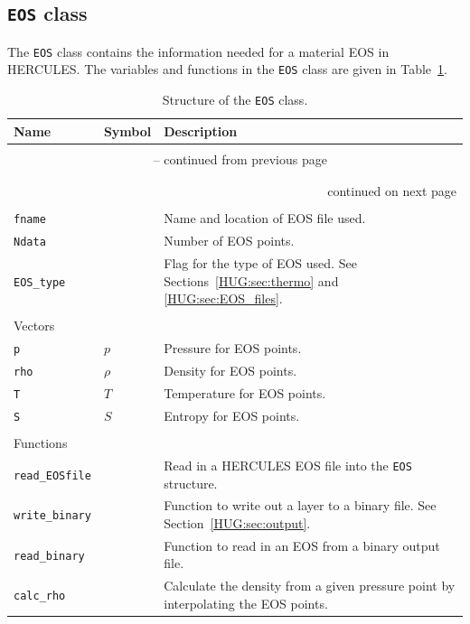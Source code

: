 \documentclass[11pt, oneside]{article}   	%
\begin{document}
\subsection{\texttt{EOS} class}
\label{HUG:sec:EOS_class}

The \texttt{EOS} class contains the information needed for a material EOS in HERCULES.
The variables and functions in the \texttt{EOS} class are given in Table~\ref{HUG:tab:EOS_class}.

\begin{longtable}{l l p{10cm}}
\caption{Structure of the \texttt{EOS} class.}
\label{HUG:tab:EOS_class} \\

Name & Symbol & Description \\ \hline \hline
\multicolumn{3}{l}{} \\
\endfirsthead

\multicolumn{3}{c}{{\tablename\ \thetable{} -- continued from previous page}} \\
\multicolumn{3}{l}{} \\
\endhead

\multicolumn{3}{l}{} \\
\multicolumn{3}{r}{{continued on next page}} \\
\endfoot

\endlastfoot

\multicolumn{3}{l}{Variables} \\
\hline
\texttt{fname} & & Name and location of EOS file used. \\
\texttt{Ndata} & & Number of EOS points. \\
\texttt{EOS\_type} & & Flag for the type of EOS used. See Sections~\ref{HUG:sec:thermo} and \ref{HUG:sec:EOS_files}. \\


\multicolumn{3}{l}{} \\
\multicolumn{3}{l}{Vectors} \\
\hline
\texttt{p} & $p$ & Pressure for EOS points. \\
\texttt{rho} & $\rho$ & Density for EOS points. \\
\texttt{T} & $T$ & Temperature for EOS points. \\
\texttt{S} & $S$ & Entropy for EOS points. \\

\multicolumn{3}{l}{} \\
\multicolumn{3}{l}{Functions} \\
\hline
\texttt{read\_EOSfile} & & Read in a HERCULES EOS file into the \texttt{EOS} structure. \\
\texttt{write\_binary} & & Function to write out a layer to a binary file. See Section~\ref{HUG:sec:output}. \\
\texttt{read\_binary} & & Function to read in an EOS from a binary output file. \\
\texttt{calc\_rho} & & Calculate the density from a given pressure point by interpolating the EOS points. \\

\end{longtable}
\end{document}
